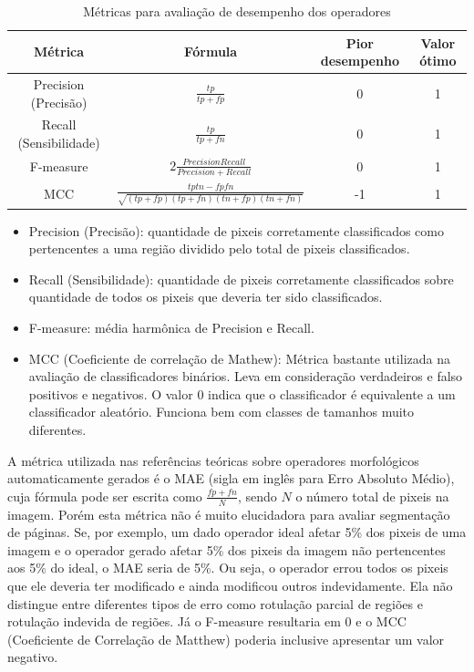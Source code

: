 \documentclass[a4paper,11pt]{article}
\begin{document}
  \begin{table}[htb]
    \caption{Métricas para avaliação de desempenho dos operadores}
    \begin{tabular}{ | c | c | c | c | }
      \hline
      Métrica & Fórmula & Pior desempenho & Valor ótimo 
      \\ \hline
      Precision (Precisão) & $\frac{tp}{tp + fp}$ & 0 & 1
      \\ \hline
      Recall (Sensibilidade) & $\frac{tp}{tp + fn}$ & 0 & 1
      \\ \hline
      F-measure & $2 \frac{Precision Recall}{Precision + Recall}$ & 0 & 1
      \\ \hline
      MCC & $\frac{tp tn - fp fn}{\sqrt{(tp + fp)(tp + fn)(tn + fp)(tn + fn)}}$ & -1 & 1
      \\ \hline
    \end{tabular}
    \label{tab:metrics}
  \end{table}

  \begin{itemize}
    \item Precision (Precisão): quantidade de pixeis corretamente classificados como pertencentes a uma região dividido pelo total de pixeis classificados.
    \item Recall (Sensibilidade): quantidade de pixeis corretamente classificados sobre quantidade de todos os pixeis que deveria ter sido classificados.
    \item F-measure: média harmônica de Precision e Recall.
    \item MCC (Coeficiente de correlação de Mathew): Métrica bastante utilizada na avaliação de classificadores binários. Leva em consideração verdadeiros e falso positivos e negativos. O valor 0 indica que o classificador é equivalente a um classificador aleatório. Funciona bem com classes de tamanhos muito diferentes.
  \end{itemize}

  A métrica utilizada nas referências teóricas sobre operadores morfológicos automaticamente gerados é o MAE (sigla em inglês para Erro Absoluto Médio), cuja fórmula pode ser escrita como $\frac{fp + fn}{N}$, sendo $N$ o número total de pixeis na imagem. Porém esta métrica não é muito elucidadora para avaliar segmentação de páginas. Se, por exemplo, um dado operador ideal afetar 5\% dos pixeis de uma imagem e o operador gerado afetar 5\% dos pixeis da imagem não pertencentes aos 5\% do ideal, o MAE seria de 5\%. Ou seja, o operador errou todos os pixeis que ele deveria ter modificado e ainda modificou outros indevidamente. Ela não distingue entre diferentes tipos de erro como rotulação parcial de regiões e rotulação indevida de regiões. Já o F-measure resultaria em 0 e o MCC (Coeficiente de Correlação de Matthew) poderia inclusive apresentar um valor negativo.
\end{document}
